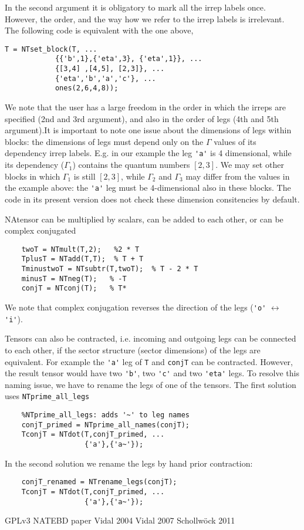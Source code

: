 \documentclass[aps,prb,twocolumn,showpacs,preprintnumbers,amsmath,amssymb, superscriptaddressm, nofootinbib]{revtex4-2}   %
\begin{document}
In the second argument it is obligatory to mark all the irrep labels once. However, the order, and the way how we refer to the irrep labels is irrelevant. The following code is equivalent with the one above,
\begin{verbatim}
T = NTset_block(T, ...
            {{'b',1},{'eta',3}, {'eta',1}}, ...
            {[3,4] ,[4,5], [2,3]}, ...
            {'eta','b','a','c'}, ...
            ones(2,6,4,8)); 
\end{verbatim}
We note that the user has a large freedom in the order in which the irreps are specified (2nd and 3rd argument), and also in the order of legs (4th and 5th argument).It is important to note one issue about the dimensions of legs within blocks: the dimensions of legs must depend only on the $\Gamma$ values of its dependency irrep labels. E.g. in our example the leg \verb|'a'| is 4 dimensional, while its dependency ($\Gamma_1$) contains the quantum numbers $[2,3]$. We may set other blocks in which $\Gamma_1$ is still $[2,3]$, while $\Gamma_2$ and $\Gamma_3$ may differ from the values in the example above: the \verb|'a'| leg must be $4$-dimensional also in these blocks. The code in its present version does not check these dimension consitencies by default.

NAtensor can be multiplied by scalars, can be added to each other, or can be complex conjugated
\begin{verbatim}
    twoT = NTmult(T,2);   %2 * T 
    TplusT = NTadd(T,T);  % T + T
    TminustwoT = NTsubtr(T,twoT);  % T - 2 * T
    minusT = NTneg(T);   % -T
    conjT = NTconj(T);   % T*
\end{verbatim}
We note that complex conjugation reverses the direction of the legs (\verb|'o'| $\leftrightarrow$ \verb|'i'|).

Tensors can also be contracted, i.e. incoming and outgoing legs can be connected to each other, if the sector structure (sector dimensions) of the legs are equivalent. For example the \verb|'a'| leg of \verb|T| and \verb|conjT| can be contracted. However, the result tensor would have two \verb|'b'|, two \verb|'c'| and two \verb|'eta'| legs. To resolve this naming issue, we have to rename the legs of one of the tensors. The first solution uses \verb|NTprime_all_legs|
\begin{verbatim}
    %NTprime_all_legs: adds '~' to leg names
    conjT_primed = NTprime_all_names(conjT);
    TconjT = NTdot(T,conjT_primed, ... 
                   {'a'},{'a~'});
\end{verbatim}
In the second solution we rename the legs by hand prior contraction:
\begin{verbatim}
    conjT_renamed = NTrename_legs(conjT);
    TconjT = NTdot(T,conjT_primed, ... 
                   {'a'},{'a~'});
\end{verbatim}





\begin{thebibliography}{99}
 GPLv3
 NATEBD paper
 Vidal 2004
 Vidal 2007
 Schollwöck 2011 
\end{thebibliography}
\end{document}
